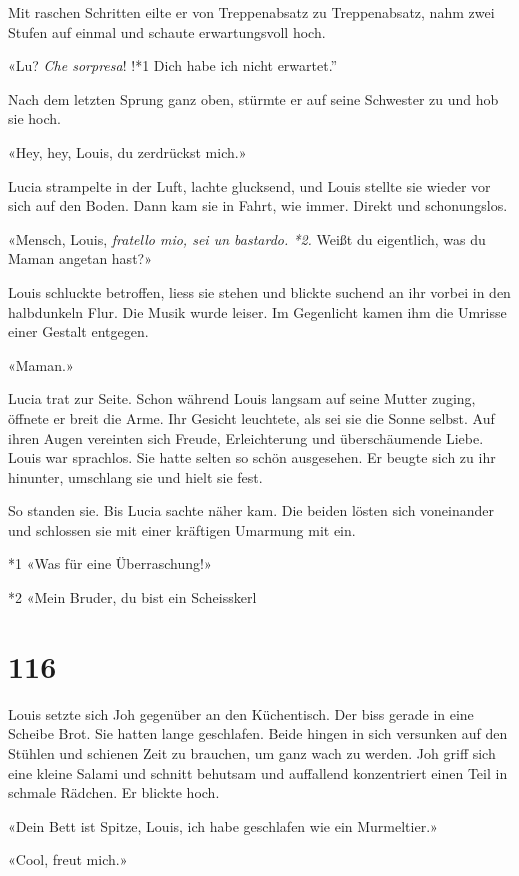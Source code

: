 Mit raschen Schritten eilte er von Treppenabsatz zu Treppenabsatz, nahm
zwei Stufen auf einmal und schaute erwartungsvoll hoch.

«Lu? \emph{Che sorpresa}! !*1 Dich habe ich nicht erwartet.''

Nach dem letzten Sprung ganz oben, stürmte er auf seine Schwester zu und
hob sie hoch.

«Hey, hey, Louis, du zerdrückst mich.»

Lucia strampelte in der Luft, lachte glucksend, und Louis stellte sie
wieder vor sich auf den Boden. Dann kam sie in Fahrt, wie immer. Direkt
und schonungslos.

«Mensch, Louis, \emph{fratello mio, sei un bastardo. *2.} Weißt du
eigentlich, was du Maman angetan hast?»

Louis schluckte betroffen, liess sie stehen und blickte suchend an ihr
vorbei in den halbdunkeln Flur. Die Musik wurde leiser. Im Gegenlicht
kamen ihm die Umrisse einer Gestalt entgegen.

«Maman.»

Lucia trat zur Seite. Schon während Louis langsam auf seine Mutter
zuging, öffnete er breit die Arme. Ihr Gesicht leuchtete, als sei sie
die Sonne selbst. Auf ihren Augen vereinten sich Freude, Erleichterung
und überschäumende Liebe. Louis war sprachlos. Sie hatte selten so schön
ausgesehen. Er beugte sich zu ihr hinunter, umschlang sie und hielt sie
fest.

So standen sie. Bis Lucia sachte näher kam. Die beiden lösten sich
voneinander und schlossen sie mit einer kräftigen Umarmung mit ein.

*1 «Was für eine Überraschung!»

*2 «Mein Bruder, du bist ein Scheisskerl

\chapter{116}\label{section-116}

Louis setzte sich Joh gegenüber an den Küchentisch. Der biss gerade in
eine Scheibe Brot. Sie hatten lange geschlafen. Beide hingen in sich
versunken auf den Stühlen und schienen Zeit zu brauchen, um ganz wach zu
werden. Joh griff sich eine kleine Salami und schnitt behutsam und
auffallend konzentriert einen Teil in schmale Rädchen. Er blickte hoch.

«Dein Bett ist Spitze, Louis, ich habe geschlafen wie ein Murmeltier.»

«Cool, freut mich.»


